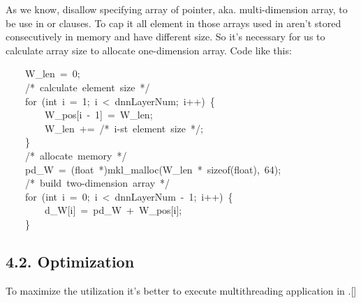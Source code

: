\documentclass{article}
\begin{document}
\noindent{}As we know,  disallow specifying array of pointer, aka. multi-dimension array, to be use in  or  clauses. To cap it all element in those arrays used in  aren't stored consecutively in memory and have different size. So it's necessary for us to calculate array size to allocate one-dimension array. Code like this:%
\begin{mdpre}%
\noindent~~~~{W\_len}~=~{0};\\
~~~~{/*}{~calculate~element~size~}{*/}\\
~~~~{for}~({int}~i~=~{1};~i~\textless{}~dnnLayerNum;~i++)~\{\\
~~~~~~~~{W\_pos}[i~-~{1}]~=~{W\_len};\\
~~~~~~~~{W\_len}~+=~{/*}{~i-st~element~size~}{*/};\\
~~~~\}\\
~~~~{/*}{~allocate~memory~}{*/}\\
~~~~pd\_W~=~({float}~*)mkl\_malloc({W\_len}~*~sizeof({float}),~{64});\\
~~~~{/*}{~build~two-dimension~array~}{*/}\\
~~~~{for}~({int}~i~=~{0};~i~\textless{}~dnnLayerNum~-~{1};~i++)~\{\\
~~~~~~~~d\_W[i]~=~pd\_W~+~{W\_pos}[i];\\
~~~~\}\\
\end{mdpre}
\subsection{4.2.\hspace*{0.5em} Optimization}\label{sec-openmp-optimization}%

\noindent{}To maximize the utilization it's better to execute multithreading application in .[]%
\end{document}
